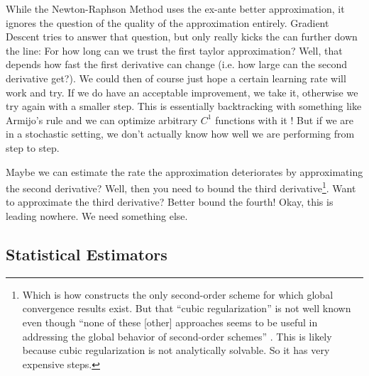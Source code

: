 While the Newton-Raphson Method uses the ex-ante better approximation, it
ignores the question of the quality of the approximation entirely. Gradient
Descent tries to answer that question, but only really kicks the can further
down the line: For how long can we trust the first taylor approximation? Well,
that depends how fast the first derivative can change (i.e. how large can the
second derivative get?). We could then of course just hope a certain learning
rate will work and try. If we do have an acceptable improvement, we take it,
otherwise we try again with a smaller step. This is essentially backtracking with 
something like Armijo's rule and we can optimize arbitrary \(C^1\) functions with it
\parencite{truongBacktrackingGradientDescent2019}!
But if we are in a stochastic setting, we don't actually know how well we are
performing from step to step.


Maybe we can estimate the rate the approximation deteriorates by
approximating the second derivative? Well, then you need to bound the third
derivative\footnote{
	Which is how \textcite[Section 4.1]{nesterovLecturesConvexOptimization2018}
	constructs the only second-order scheme for which global convergence results
	exist.  But that ``cubic regularization'' is not well known even though
	``none of these [other] approaches seems to be useful in addressing the
	global behavior of second-order schemes'' \parencite[p.
	242]{nesterovLecturesConvexOptimization2018}. This is likely because cubic
	regularization is not analytically solvable. So it has very expensive steps.
}. Want to approximate the third derivative? Better bound the fourth!  Okay,
this is leading nowhere. We need something else.

\subsection{Statistical Estimators}

